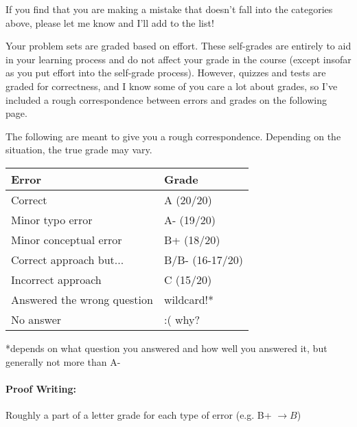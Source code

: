 \documentclass[12pt]{article}
\theoremstyle{definition}
\begin{document}
If you find that you are making a mistake that doesn't fall into the categories above, please let me know and I'll add to the list!


\vspace{1cm}

Your problem sets are graded based on effort. These self-grades are entirely to aid in your learning process and do not affect your grade in the course (except insofar as you put effort into the self-grade process). However, quizzes and tests are graded for correctness, and I
know some of you care a lot about grades, so I've included a rough correspondence between errors and grades on the following page. 

\newpage

The following are meant to give you a rough correspondence. Depending on the situation, the true grade may vary.


\begin{tabular}{|l|l|}
\hline
{\bf Error}& {\bf Grade}\\
\hline
  Correct &A (20/20)\\
  \hline 
  Minor typo error & A- (19/20)\\
  \hline
  Minor conceptual error &B+ (18/20)\\
  \hline
  Correct approach but...&B/B- (16-17/20)\\
  \hline
   Incorrect approach &C (15/20)\\
  \hline
  Answered the wrong question & wildcard!*  \\
  \hline
  No answer & :( why?  \\
  \hline
\end{tabular}
\bigskip



*depends on what question you answered and how well you answered it, but generally not more than A-

\paragraph{Proof Writing:} Roughly a part of a letter grade for each type of error (e.g. B+ $\rightarrow B$)
\end{document}
